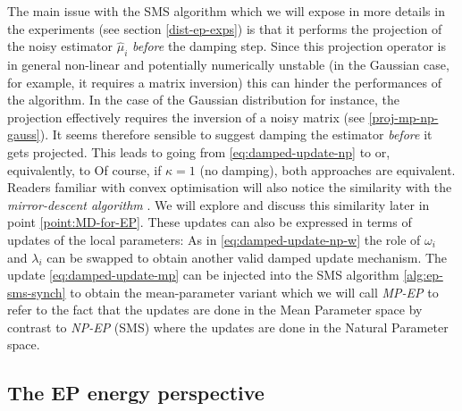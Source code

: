 The main issue with the SMS algorithm which we will expose in more details in the experiments (see section \ref{dist-ep-exps}) is that it performs the projection of the noisy estimator $\hat\mu_{i}$ \emph{before} the damping step. Since this projection operator is in general non-linear and potentially numerically unstable (in the Gaussian case, for example, it requires a matrix inversion) this can hinder the performances of the algorithm. In the case of the Gaussian distribution for instance, the projection effectively requires the inversion of a noisy matrix (see \eqref{proj-mp-np-gauss}). It seems therefore sensible to suggest damping the estimator \emph{before} it gets projected. This leads to going from \eqref{eq:damped-update-np} to
%
%
or, equivalently, to
%
%
Of course, if $\kappa=1$ (no damping), both approaches are equivalent. Readers familiar with convex optimisation will also notice the similarity with the \emph{mirror-descent algorithm} \citep{nemirovski83, beck03}. We will explore and discuss this similarity later in point \ref{point:MD-for-EP}. 
These updates can also be expressed in terms of updates of the local parameters:
%
%
As in \eqref{eq:damped-update-np-w} the role of $\omega_{i}$ and $\lambda_{i}$ can be swapped to obtain another valid damped update mechanism. 
The update \eqref{eq:damped-update-mp} can be injected into the SMS algorithm \ref{alg:ep-sms-synch} to obtain the mean-parameter variant which we will call \emph{MP-EP} to refer to the fact that the updates are done in the Mean Parameter space by contrast to \emph{NP-EP} (SMS) where the updates are done in the Natural Parameter space. 

 

\subsection{The EP energy perspective}

